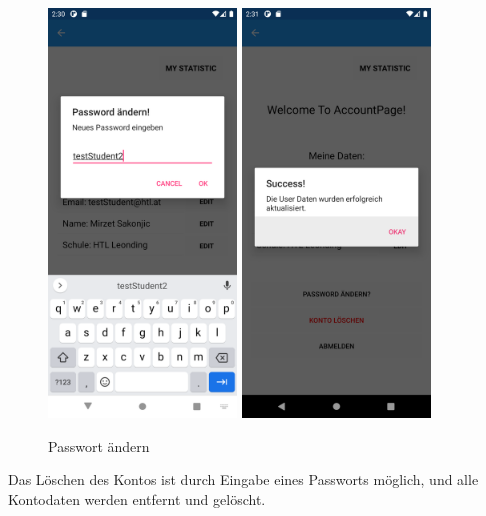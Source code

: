 \begin{figure}[h]
    \begin{center}
    \includegraphics[width=5cm]{pics/Xamarin Student/21.png}\hfill
    \includegraphics[width=5cm]{pics/Xamarin Student/22.png}
    \caption[MyAccount]{Passwort ändern}
    \end{center}
\end{figure}
\newpage
Das Löschen des Kontos ist durch Eingabe eines Passworts möglich, und alle Kontodaten werden entfernt und gelöscht.
